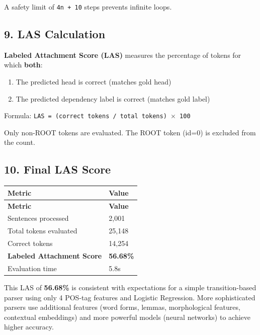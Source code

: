 \documentclass[11pt,a4paper]{article}
\begin{document}
A safety limit of \texttt{4n + 10} steps prevents infinite loops.

\subsection*{9. LAS Calculation}

\textbf{Labeled Attachment Score (LAS)} measures the percentage of tokens for which \textbf{both}:

\begin{enumerate}
\item The predicted head is correct (matches gold head)
\item The predicted dependency label is correct (matches gold label)
\end{enumerate}

Formula: \texttt{LAS = (correct tokens /\allowbreak{} total tokens) $\times$ 100}

Only non-ROOT tokens are evaluated. The ROOT token (id=0) is excluded from the count.

\subsection*{10. Final LAS Score}

{\small
\setlength{\tabcolsep}{4pt}
\begin{longtable}{ll}
\toprule
\textbf{Metric} & \textbf{Value} \\
\midrule
\endfirsthead
\toprule
\textbf{Metric} & \textbf{Value} \\
\midrule
\endhead
Sentences processed & 2,001 \\
Total tokens evaluated & 25,148 \\
Correct tokens & 14,254 \\
\textbf{Labeled Attachment Score} & \textbf{56.68\%} \\
Evaluation time & 5.8s \\
\bottomrule
\end{longtable}}

This LAS of \textbf{56.68\%} is consistent with expectations for a simple transition-based parser using only 4 POS-tag features and Logistic Regression. More sophisticated parsers use additional features (word forms, lemmas, morphological features, contextual embeddings) and more powerful models (neural networks) to achieve higher accuracy.
\end{document}
